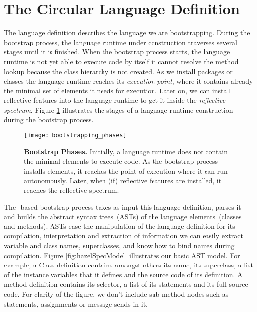 %

\section{The Circular Language Definition}\label{sec:circular_definition}

The language definition describes the language we are bootstrapping. During the bootstrap process, the language runtime under construction traverses several stages until it is finished. When the bootstrap process starts, the language runtime is not yet able to execute code by itself \eg it cannot resolve the method lookup because the class hierarchy is not created. As we install packages or classes the language runtime reaches its \emph{execution point}, where it contains already the minimal set of elements it needs for execution. Later on, we can install reflective features into the language runtime to get it inside the \emph{reflective spectrum}. Figure \ref{fig:phases} illustrates the stages of a language runtime construction during the bootstrap process.

\begin{figure}[ht]
\center
\texttt{[image: bootstrapping\_phases]}
\caption{\textbf{Bootstrap Phases.} Initially, a language runtime does not contain the minimal elements to execute code. As the bootstrap process installs elements, it reaches the point of execution where it can run autonomously. Later, when (if) reflective features are installed, it reaches the reflective spectrum.\label{fig:phases}}
\end{figure}

The \Vtt-based bootstrap process takes as input this language definition, parses it and builds the abstract syntax trees~(ASTs) of the language elements~(\eg classes and methods).
ASTs ease the manipulation of the language definition for its compilation, interpretation and extraction of information \eg we can easily extract variable and class names, superclasses, and know how to bind names during compilation. Figure \ref{fig:hazelSpecModel} illustrates our basic AST model. For example, a Class definition contains amongst others its name, its superclass, a list of the instance variables that it defines and the source code of its definition. A method definition contains its selector, a list of its statements and its full source code. For clarity of the figure, we don't include sub-method nodes such as statements, assignments or message sends in it.

